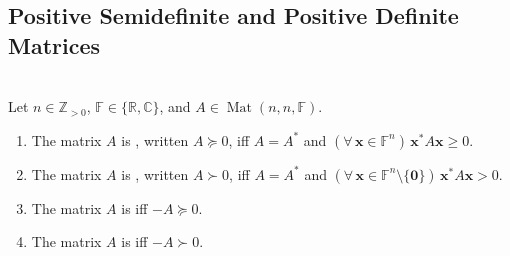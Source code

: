 \subsection{Positive Semidefinite and Positive Definite Matrices}

\begin{definition} \label{def:positive-semidefinite-matrix} \\
Let $n\in\mathbb{Z}_{>0}$, $\mathbb{F}\in\{\mathbb{R},\mathbb{C}\}$, and $A\in\operatorname{Mat}(n,n,\mathbb{F})$.
\begin{enumerate}[label=(\roman*)]
\setlength{\itemsep}{0pt}
\item The matrix $A$ is , written $A\succeq0$, iff $A=A^*$ and $(\forall\,\mathbf{x}\in\mathbb{F}^n)\,\mathbf{x}^*A\mathbf{x}\geq0$.
\item The matrix $A$ is , written $A\succ0$, iff $A=A^*$ and $(\forall\,\mathbf{x}\in\mathbb{F}^n\setminus\{\mathbf{0}\})\,\mathbf{x}^*A\mathbf{x}>0$.
\item The matrix $A$ is  iff $-A\succeq0$.
\item The matrix $A$ is  iff $-A\succ0$.
\end{enumerate}
\end{definition}

